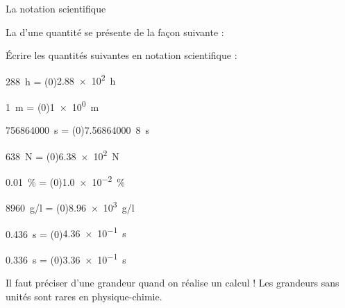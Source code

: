 \begin{doc}{La notation scientifique}
  \begin{importants}
  La  d'une quantité se présente de la façon suivante :
  \begin{center}
    \hspace{5pt}
    \qq{}
  \end{center}
  \vspace*{-32pt}
  \end{importants}
\end{doc}

\numeroQuestion Écrire les quantités suivantes en notation scientifique :
\vspace*{-8pt}
\begin{listePoints}[2]
  \item \qty{288}{\hour}      = \texteTrou(0){\qty{2,88e2}{\hour}\\}
  \item \qty{1}{\m}           = \texteTrou(0){\qty{1e0}{\m}\\}
  \item \qty{756 864 000}{\s} = \texteTrou(0){\qty{7,56 864 000}{8\s}\\}
  \item \qty{638}{\newton}    = \texteTrou(0){\qty{6,38e2}{\newton}}
  \item \qty{0,01}{\percent}  = \texteTrou(0){\qty{1,0e-2}{\percent}\\}
  \item \qty{8960}{\g/\l}     = \texteTrou(0){\qty{8,96e3}{\g/\l}\\}
  \item \qty{0,436}{\s}       = \texteTrou(0){\qty{4,36e-1}{\s}\\}
  \item \qty{0,336}{\s}       = \texteTrou(0){\qty{3,36e-1}{\s}}
\end{listePoints}
\vspace*{-16pt}

\attention Il faut  préciser  d'une grandeur quand on réalise un calcul !
Les grandeurs sans unités sont rares en physique-chimie.


